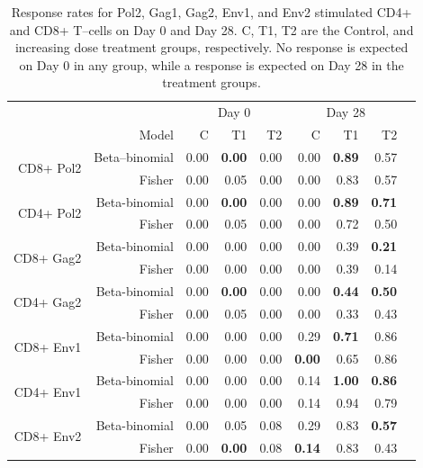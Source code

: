 \documentclass[11pt]{article}
\begin{document}
\begin{table}[ht]
\begin{center}
\caption{Response rates for Pol2, Gag1, Gag2, Env1, and Env2 stimulated CD4+ and CD8+ T--cells on Day 0 and Day 28. C, T1, T2 are the Control, and increasing dose treatment groups, respectively. No response is expected on Day 0 in any group, while a response is expected on Day 28 in the treatment groups.}\label{tab:positivityrates}
\begin{tabular}{rrrrrrrrr}
  \hline
 &&\multicolumn{3}{c}{Day 0}&\multicolumn{3}{c}{Day 28}\\
  \cmidrule{3-8}
&Model & C  & T1 & T2  &   C  & T1  & T2  \\ 
  \cmidrule{2-8}
\multirow{2}{*}{CD8+ Pol2}&Beta--binomial & 0.00 & \textbf{0.00} & 0.00 &   0.00 & \textbf{0.89} & 0.57 \\ 
& Fisher & 0.00 & 0.05 & 0.00 &   0.00 & 0.83 & 0.57 \\ 
   \hline
\multirow{2}{*}{CD4+ Pol2}&Beta-binomial & 0.00 & \textbf{0.00} & 0.00 &   0.00 & \textbf{0.89} & \textbf{0.71} \\ 
&Fisher & 0.00 & 0.05 & 0.00  & 0.00 & 0.72 & 0.50 \\ 
 \hline
\multirow{2}{*}{CD8+ Gag2}& Beta-binomial & 0.00 & 0.00 & 0.00  & 0.00 & 0.39 & \textbf{0.21} \\ 
& Fisher & 0.00 & 0.00 & 0.00  & 0.00 & 0.39 & 0.14 \\ 
   \hline
\multirow{2}{*}{CD4+ Gag2}& Beta-binomial & 0.00 & \textbf{0.00} & 0.00 &  0.00 & \textbf{0.44} & \textbf{0.50} \\ 
 & Fisher & 0.00 & 0.05 & 0.00 &  0.00 & 0.33 & 0.43 \\ 
   \hline
\multirow{2}{*}{ CD8+ Env1}& Beta-binomial  & 0.00 & 0.00 & 0.00 & 0.29 & \textbf{0.71} & 0.86 \\ 
   & Fisher & 0.00 & 0.00 & 0.00 &  \textbf{0.00} & 0.65 & 0.86 \\ 
   \hline
\multirow{2}{*}{  CD4+ Env1}& Beta-binomial   & 0.00 & 0.00 & 0.00 &  0.14 & \textbf{1.00} & \textbf{0.86} \\ 
 & Fisher & 0.00 & 0.00 & 0.00 &  0.14 & 0.94 & 0.79 \\ 
   \hline
\multirow{2}{*}{CD8+ Env2}  & Beta-binomial & 0.00 & 0.05 & 0.08  & 0.29 & 0.83 & \textbf{0.57} \\ 
  & Fisher & 0.00 & \textbf{0.00} & 0.08 & \textbf{0.14} & 0.83 & 0.43 \\ 

\end{tabular}
\end{center}
\end{table}
\end{document}

